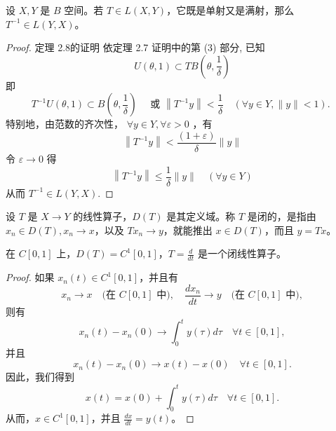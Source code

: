 \documentclass[lang=cn,newtx,10pt,scheme=chinese,thmcnt=chapter]{elegantbook}
\begin{document}
\begin{theorem}[Banach]
	设 $X, Y$ 是 $B$ 空间。若 $T \in L(X, Y)$，它既是单射又是满射，那么 $T^{-1} \in L(Y, X)$。
\end{theorem}
\begin{proof}
定理 2.8的证明 依定理 2.7 证明中的第 (3) 部分, 已知
\begin{equation*}
	U(\theta, 1) \subset T B\left(\theta, \frac{1}{\delta}\right)
\end{equation*}即
\begin{equation*}
	T^{-1} U(\theta, 1) \subset B\left(\theta, \frac{1}{\delta}\right) \quad \text { 或 }\left\|T^{-1} y\right\|<\frac{1}{\delta} \quad(\forall y \in Y ,\|y\|<1) \text {. }
\end{equation*}
特别地，由范数的齐次性， $\forall y \in Y , \forall \varepsilon>0$ ，有
\begin{equation*}
	\left\|T^{-1} y\right\|<\frac{(1+\varepsilon)}{\delta}\|y\|
\end{equation*}
令 $\varepsilon \rightarrow 0$ 得
\begin{equation*}
	\left\|T^{-1} y\right\| \leqslant \frac{1}{\delta}\|y\| \quad(\forall y \in Y )
\end{equation*}
从而 $T^{-1} \in L ( Y , X )$.
\end{proof}


\begin{definition}[闭线性算子]
设 $T$ 是 $X \rightarrow Y$ 的线性算子，$D(T)$ 是其定义域。称 $T$ 是闭的，是指由 $x_n \in D(T), x_n \rightarrow x$，以及 $T x_n \rightarrow y$，就能推出 $x \in D(T)$，而且 $y = T x$。
\end{definition}

\begin{example}
在 $C[0,1]$ 上，$D(T) = C^1[0,1]$，$T = \frac{d}{dt}$ 是一个闭线性算子。
\end{example}

\begin{proof}如果 $x_n(t) \in C^1[0,1]$，并且有
\[
x_n \to x \quad \text{(在 $C[0,1]$ 中)}, \quad \frac{d x_n}{d t} \to y \quad \text{(在 $C[0,1]$ 中)},
\]
则有
\[
x_n(t) - x_n(0) \to \int_0^t y(\tau) d\tau \quad \forall t \in [0,1],
\]
并且
\[
x_n(t) - x_n(0) \to x(t) - x(0) \quad \forall t \in [0,1].
\]
因此，我们得到
\[
x(t) = x(0) + \int_0^t y(\tau) d\tau \quad \forall t \in [0,1].
\]
从而，$x \in C^1[0,1]$，并且 $\frac{d x}{d t} = y(t)$。
\end{proof}
\end{document}
